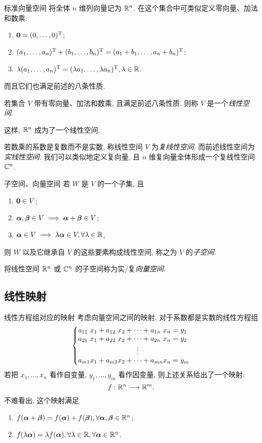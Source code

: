 \begin{frame}{标准向量空间}
	\onslide<+->
	将全体 $n$ 维列向量记为 ${\mathbb{R}}^n$.
	\onslide<+->
	在这个集合中可类似定义零向量、加法和数乘:
	\begin{enumerate}
		\item ${\bf0}=(0,\dots,0)^{\mathrm{T}}$;
		\item $(a_1,\dots,a_n)^{\mathrm{T}}+(b_1,\dots,b_n)^{\mathrm{T}}=(a_1+b_1,\dots,a_n+b_n)^{\mathrm{T}}$;
		\item $\lambda(a_1,\dots,a_n)^{\mathrm{T}}=(\lambda a_1,\dots,\lambda a_n)^{\mathrm{T}},\lambda\in{\mathbb{R}}$.
	\end{enumerate}
	\onslide<+->
	而且它们也满足前述的八条性质.
	\onslide<+->
	\begin{definition}
		若集合 $V$ 带有零向量、加法和数乘, 且满足前述八条性质, 则称 $V$ 是一个\emph{线性空间}.
	\end{definition}
	\onslide<+->
	这样, ${\mathbb{R}}^n$ 成为了一个线性空间.

	\onslide<+->
	若数乘的系数是复数而不是实数, 称线性空间 $V$ 为\emph{复线性空间}, 而前述线性空间为\emph{实线性空间}.
	\onslide<+->
	我们可以类似地定义复向量, 且 $n$ 维复向量全体形成一个复线性空间 ${\mathbb{C}}^n$.
\end{frame}


\begin{frame}{子空间、向量空间}
	\onslide<+->
	若 $W$ 是 $V$ 的一个子集, 且
	\begin{enumerate}
		\item ${\bf0}\in V$;
		\item ${\boldsymbol{\alpha}},{\boldsymbol{\beta}}\in V\implies {\boldsymbol{\alpha}}+{\boldsymbol{\beta}}\in V$;
		\item ${\boldsymbol{\alpha}}\in V\implies \lambda{\boldsymbol{\alpha}}\in V, \forall\lambda\in{\mathbb{R}}$,
	\end{enumerate}
	\onslide<+->
	则 $W$ 以及它继承自 $V$ 的这些要素构成线性空间, 称之为 $V$ 的\emph{子空间}.

	\onslide<+->
	将线性空间 ${\mathbb{R}}^n$ 或 ${\mathbb{C}}^n$ 的子空间称为实/复\emph{向量空间}.
\end{frame}


\subsection{线性映射}
\begin{frame}{线性方程组对应的映射}
	\onslide<+->
	考虑向量空间之间的映射.
	\onslide<+->
	对于系数都是实数的线性方程组
	\[\laeq[lclcclcl]{
		a_{11}&x_1+{}&a_{12}&x_2&{}+\cdots+{}&a_{1n}&x_n={}&y_1\\
		a_{21}&x_1+{}&a_{22}&x_2&{}+\cdots+{}&a_{2n}&x_n={}&y_2\\
		&&&&\vdots&&&\\
		a_{m1}&x_1+{}&a_{m2}&x_2&{}+\cdots+{}&a_{mn}&x_n={}&y_m
	}\]
	\onslide<+->
	若把 $x_1,\dots,x_n$ 看作自变量, $y_1,\dots,y_m$ 看作因变量, 则上述关系给出了一个映射:
	\[f:{\mathbb{R}}^n\longrightarrow{\mathbb{R}}^m.\]
	\onslide<+->
	不难看出, 这个映射满足
	\begin{enumerate}
		\item $f({\boldsymbol{\alpha}}+{\boldsymbol{\beta}})=f({\boldsymbol{\alpha}})+f({\boldsymbol{\beta}}),\forall {\boldsymbol{\alpha}},{\boldsymbol{\beta}}\in {\mathbb{R}}^n$;
		\item $f(\lambda {\boldsymbol{\alpha}})=\lambda f({\boldsymbol{\alpha}}),\forall \lambda\in{\mathbb{R}},\forall{\boldsymbol{\alpha}}\in {\mathbb{R}}^n$.
	\end{enumerate}
\end{frame}


